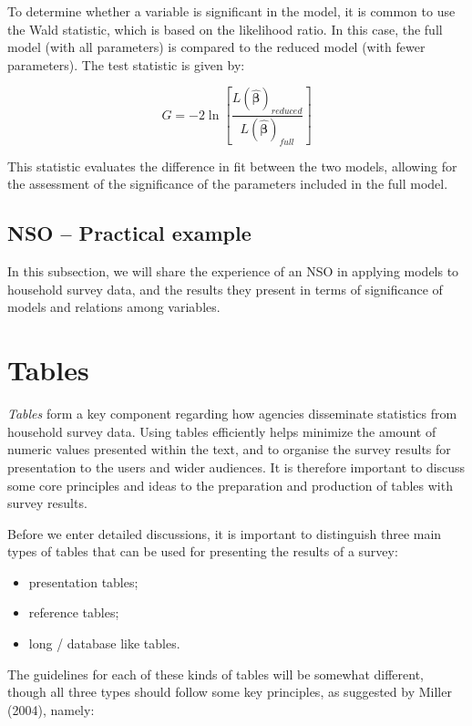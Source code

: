 \documentclass[
  12pt,
]{book}
\begin{document}
To determine whether a variable is significant in the model, it is common to use the Wald statistic, which is based on the likelihood ratio. In this case, the full model (with all parameters) is compared to the reduced model (with fewer parameters). The test statistic is given by:

\[
G=-2\ln\left[\frac{L\left(\hat{\boldsymbol{\beta}}\right)_{reduced}}{L\left(\hat{\boldsymbol{\beta}}\right)_{full}}\right]
\]

This statistic evaluates the difference in fit between the two models, allowing for the assessment of the significance of the parameters included in the full model.

\section{NSO -- Practical example}\label{nso-practical-example-2}

In this subsection, we will share the experience of an NSO in applying models to household survey data, and the results they present in terms of significance of models and relations among variables.

\chapter{Tables}\label{tables}

\emph{Tables} form a key component regarding how agencies disseminate statistics from household survey data. Using tables efficiently helps minimize the amount of numeric values presented within the text, and to organise the survey results for presentation to the users and wider audiences. It is therefore important to discuss some core principles and ideas to the preparation and production of tables with survey results.

Before we enter detailed discussions, it is important to distinguish three main types of tables that can be used for presenting the results of a survey:

\begin{itemize}
\item
  presentation tables;
\item
  reference tables;
\item
  long / database like tables.
\end{itemize}

The guidelines for each of these kinds of tables will be somewhat different, though all three types should follow some key principles, as suggested by Miller (2004), namely:
\end{document}
